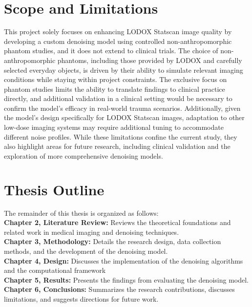 \section{Scope and Limitations}
This project solely focuses on enhancing LODOX\textsuperscript{\textregistered} Statscan\textsuperscript{\textregistered} image quality by developing a custom denoising model using controlled non-anthropomorphic phantom studies, and it does not extend to clinical trials. The choice of non-anthropomorphic phantoms, including those provided by LODOX\textsuperscript{\textregistered} and carefully selected everyday objects, is driven by their ability to simulate relevant imaging conditions while staying within project constraints. The exclusive focus on phantom studies limits the ability to translate findings to clinical practice directly, and additional validation in a clinical setting would be necessary to confirm the model's efficacy in real-world trauma scenarios. Additionally, given the model's design specifically for LODOX\textsuperscript{\textregistered} Statscan\textsuperscript{\textregistered} images, adaptation to other low-dose imaging systems may require additional tuning to accommodate different noise profiles. While these limitations confine the current study, they also highlight areas for future research, including clinical validation and the exploration of more comprehensive denoising models.


\section[Outline]{Thesis Outline}
The remainder of this thesis is organized as follows:\\
\noindent\textbf{Chapter 2, Literature Review:}  Reviews the theoretical foundations and related work in medical imaging and denoising techniques.\\
\noindent\textbf{Chapter 3, Methodology:} Details the research design, data collection methods, and the development of the denoising model.\\
\noindent\textbf{Chapter 4, Design:} Discusses the implementation of the denoising algorithms and the computational framework\\
\noindent\textbf{Chapter 5, Results:} Presents the findings from evaluating the denoising model.
\\
\noindent\textbf{Chapter 6, Conclusions:} Summarizes the research contributions, discusses limitations, and suggests directions for future work.